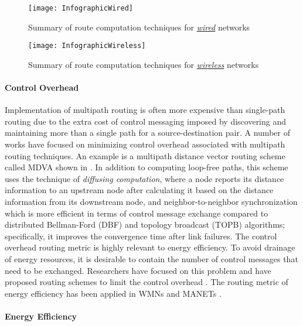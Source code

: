 \documentclass[10pt]{IEEEtran}
\begin{document}
\begin{figure*}[]
\centering
\texttt{[image: InfographicWired]}
\caption{Summary of route computation techniques for \underline{\textit{wired}} networks}
\label{fig:infographicWired}
\end{figure*}

\begin{figure*}[]
\centering
\texttt{[image: InfographicWireless]}
\caption{Summary of route computation techniques for \underline{\textit{wireless}} networks}
\label{fig:infographicWireless}
\end{figure*}

\vspace{2mm}
\paragraph{Control Overhead}
\label{subsec:controlOverhead}

Implementation of multipath routing is often more expensive than single-path routing due to the extra cost of control messaging imposed by discovering and maintaining more than a single path for a source-destination pair. A number of works have focused on minimizing control overhead associated with multipath routing techniques. An example is a multipath distance vector routing scheme called MDVA shown in \cite{vutukury2001mdva}. In addition to computing loop-free paths, this scheme uses the technique of \textit{diffusing computation}, where a node reports its distance information to an upstream node after calculating it based on the distance information from its downstream node, and neighbor-to-neighbor synchronization which is more efficient in terms of control message exchange compared to distributed Bellman-Ford (DBF) and topology broadcast (TOPB) algorithms; specifically, it improves the convergence time after link failures. The control overhead routing metric is highly relevant to energy efficiency. To avoid drainage of energy resources, it is desirable to contain the number of control messages that need to be exchanged. Researchers have focused on this problem and have proposed routing schemes to limit the control overhead \cite{nasser2007seem, wang2000multipath}. The routing metric of energy efficiency has been applied in WMNs \cite{lee2001split, marina2001demand} and MANETs \cite{lee2001split, marina2001demand}.

\vspace{2mm}
\paragraph{Energy Efficiency}
\label{subsec:Energy Efficiency}
\end{document}
